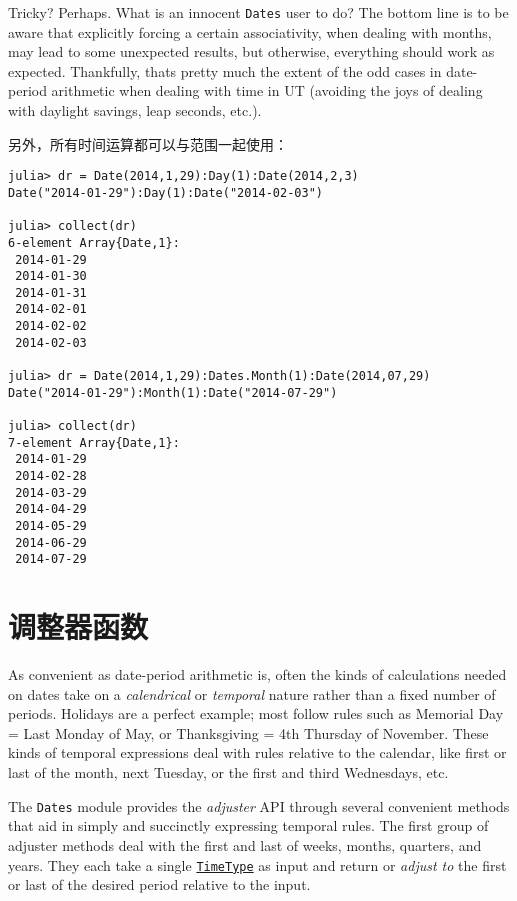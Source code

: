 Tricky? Perhaps. What is an innocent \texttt{Dates} user to do? The bottom line is to be aware that explicitly forcing a certain associativity, when dealing with months, may lead to some unexpected results, but otherwise, everything should work as expected. Thankfully, that{\textquotesingle}s pretty much the extent of the odd cases in date-period arithmetic when dealing with time in UT (avoiding the {\textquotedbl}joys{\textquotedbl} of dealing with daylight savings, leap seconds, etc.).



另外，所有时间运算都可以与范围一起使用：




\begin{verbatim}
julia> dr = Date(2014,1,29):Day(1):Date(2014,2,3)
Date("2014-01-29"):Day(1):Date("2014-02-03")

julia> collect(dr)
6-element Array{Date,1}:
 2014-01-29
 2014-01-30
 2014-01-31
 2014-02-01
 2014-02-02
 2014-02-03

julia> dr = Date(2014,1,29):Dates.Month(1):Date(2014,07,29)
Date("2014-01-29"):Month(1):Date("2014-07-29")

julia> collect(dr)
7-element Array{Date,1}:
 2014-01-29
 2014-02-28
 2014-03-29
 2014-04-29
 2014-05-29
 2014-06-29
 2014-07-29
\end{verbatim}



\hypertarget{16701273079523868506}{}


\section{调整器函数}



As convenient as date-period arithmetic is, often the kinds of calculations needed on dates take on a \emph{calendrical} or \emph{temporal} nature rather than a fixed number of periods. Holidays are a perfect example; most follow rules such as {\textquotedbl}Memorial Day = Last Monday of May{\textquotedbl}, or {\textquotedbl}Thanksgiving = 4th Thursday of November{\textquotedbl}. These kinds of temporal expressions deal with rules relative to the calendar, like first or last of the month, next Tuesday, or the first and third Wednesdays, etc.



The \texttt{Dates} module provides the \emph{adjuster} API through several convenient methods that aid in simply and succinctly expressing temporal rules. The first group of adjuster methods deal with the first and last of weeks, months, quarters, and years. They each take a single \hyperlink{4438614350756187528}{\texttt{TimeType}} as input and return or \emph{adjust to} the first or last of the desired period relative to the input.




